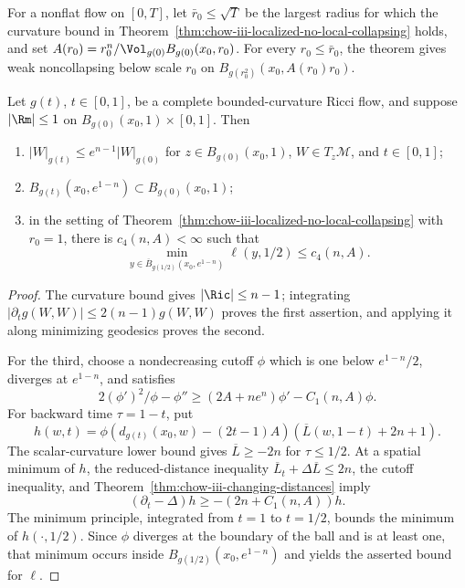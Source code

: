 \begin{remark}
\label{rem:chow-iii-localized-noncollapsing-maximal-scale}
For a nonflat flow on \([0,T]\), let \(\bar r_0\le\sqrt T\) be the largest
radius for which the curvature bound in
Theorem~\ref{thm:chow-iii-localized-no-local-collapsing} holds, and set
\(A(r_0)=r_0^n/\Vol_{g(0)}B_{g(0)}(x_0,r_0)\).  For every
\(r_0\le\bar r_0\), the theorem gives weak noncollapsing below scale \(r_0\)
on \(B_{g(r_0^2)}(x_0,A(r_0)r_0)\).
\end{remark}

\begin{lemma}
\label{lem:chow-iii-localized-reduced-distance-control}
Let \(g(t)\), \(t\in[0,1]\), be a complete bounded-curvature Ricci flow, and
suppose
\(\lvert\Rm\rvert\le1\) on \(B_{g(0)}(x_0,1)\times[0,1]\).  Then
\begin{enumerate}
\item \(|W|_{g(t)}\le e^{n-1}|W|_{g(0)}\) for
\(z\in B_{g(0)}(x_0,1)\), \(W\in T_z\mathcal M\), and \(t\in[0,1]\);
\item \(B_{g(t)}(x_0,e^{1-n})\subset B_{g(0)}(x_0,1)\);
\item in the setting of Theorem~\ref{thm:chow-iii-localized-no-local-collapsing}
with \(r_0=1\), there is \(c_4(n,A)<\infty\) such that
\[
 \min_{y\in\overline B_{g(1/2)}(x_0,e^{1-n})}\ell(y,1/2)\le c_4(n,A).
\]
\end{enumerate}
\end{lemma}
\begin{proof}
\sketch The curvature bound gives \(|\Ric|\le n-1\); integrating
\(|\partial_tg(W,W)|\le2(n-1)g(W,W)\) proves the first assertion, and applying
it along minimizing geodesics proves the second.

For the third, choose a nondecreasing cutoff \(\phi\) which is one below
\(e^{1-n}/2\), diverges at \(e^{1-n}\), and satisfies
\[
 2(\phi')^2/\phi-\phi''\ge(2A+ne^n)\phi'-C_1(n,A)\phi.
\]
For backward time \(\tau=1-t\), put
\[
 h(w,t)=\phi(d_{g(t)}(x_0,w)-(2t-1)A)(\overline L(w,1-t)+2n+1).
\]
The scalar-curvature lower bound gives \(\overline L\ge-2n\) for
\(\tau\le1/2\).  At a spatial minimum of \(h\), the reduced-distance
inequality \(\overline L_t+\Delta\overline L\le2n\), the cutoff inequality,
and Theorem~\ref{thm:chow-iii-changing-distances} imply
\[
 (\partial_t-\Delta)h\ge-(2n+C_1(n,A))h.
\]
The minimum principle, integrated from \(t=1\) to \(t=1/2\), bounds the
minimum of \(h(\cdot,1/2)\).  Since \(\phi\) diverges at the boundary of the
ball and is at least one, that minimum occurs inside
\(B_{g(1/2)}(x_0,e^{1-n})\) and yields the asserted bound for \(\ell\).
\end{proof}

